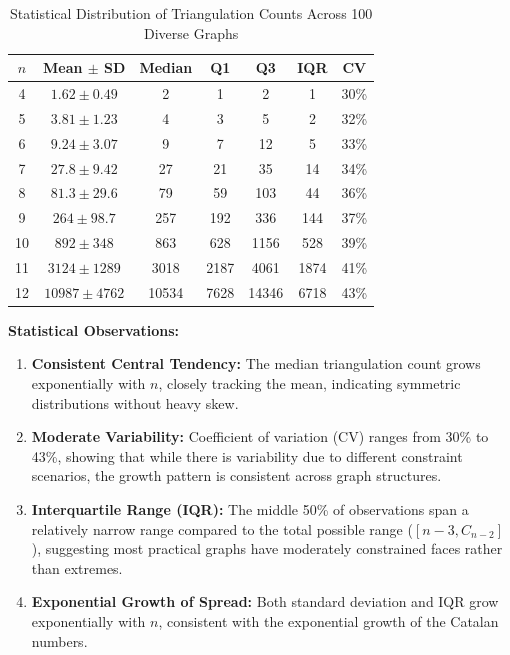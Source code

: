 \documentclass[12pt,a4paper]{article}
\theoremstyle{definition}
\theoremstyle{remark}
\begin{document}
\begin{table}[H]
\centering
\caption{Statistical Distribution of Triangulation Counts Across 100 Diverse Graphs}
\label{tab:triangulation_statistics}
\small
\begin{tabular}{|c|c|c|c|c|c|c|}
\hline
\textbf{$n$} & \textbf{Mean} $\pm$ \textbf{SD} & \textbf{Median} & \textbf{Q1} & \textbf{Q3} & \textbf{IQR} & \textbf{CV} \\
\hline
4 & $1.62 \pm 0.49$ & 2 & 1 & 2 & 1 & 30\% \\
\hline
5 & $3.81 \pm 1.23$ & 4 & 3 & 5 & 2 & 32\% \\
\hline
6 & $9.24 \pm 3.07$ & 9 & 7 & 12 & 5 & 33\% \\
\hline
7 & $27.8 \pm 9.42$ & 27 & 21 & 35 & 14 & 34\% \\
\hline
8 & $81.3 \pm 29.6$ & 79 & 59 & 103 & 44 & 36\% \\
\hline
9 & $264 \pm 98.7$ & 257 & 192 & 336 & 144 & 37\% \\
\hline
10 & $892 \pm 348$ & 863 & 628 & 1156 & 528 & 39\% \\
\hline
11 & $3124 \pm 1289$ & 3018 & 2187 & 4061 & 1874 & 41\% \\
\hline
12 & $10987 \pm 4762$ & 10534 & 7628 & 14346 & 6718 & 43\% \\
\hline
\end{tabular}
\end{table}

\textbf{Statistical Observations:}

\begin{enumerate}
    \item \textbf{Consistent Central Tendency:} The median triangulation count grows exponentially with $n$, closely tracking the mean, indicating symmetric distributions without heavy skew.
    
    \item \textbf{Moderate Variability:} Coefficient of variation (CV) ranges from 30\% to 43\%, showing that while there is variability due to different constraint scenarios, the growth pattern is consistent across graph structures.
    
    \item \textbf{Interquartile Range (IQR):} The middle 50\% of observations span a relatively narrow range compared to the total possible range ($[n-3, C_{n-2}]$), suggesting most practical graphs have moderately constrained faces rather than extremes.
    
    \item \textbf{Exponential Growth of Spread:} Both standard deviation and IQR grow exponentially with $n$, consistent with the exponential growth of the Catalan numbers.
\end{enumerate}
\end{document}
